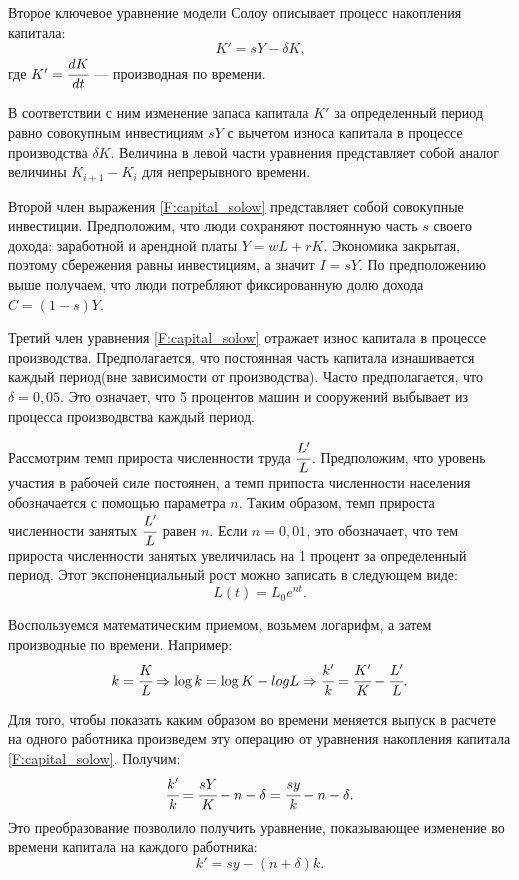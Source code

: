 Второе ключевое уравнение модели Солоу описывает процесс накопления капитала:
\begin{equation}
K' = sY-\delta K \text{,}
\label{F:capital_solow}
\end{equation}
где $K' = \cfrac{dK}{dt}$ --- производная по времени.

В соответствии с ним изменение запаса капитала $K'$ за определенный период равно совокупным инвестициям $sY$ с вычетом износа капитала в процессе производства $\delta K$.
Величина в левой части уравнения представляет собой аналог величины $K_{i+1} - K_{i}$ для непрерывного времени.

Второй член выражения \ref {F:capital_solow} представляет собой совокупные инвестиции.
Предположим, что люди сохраняют постоянную часть $s$ своего дохода: заработной и арендной платы $Y=wL+rK$.
Экономика закрытая, поэтому сбережения равны инвестициям, а значит $I=sY$.
По предположению выше получаем, что люди потребляют фиксированную долю дохода $C=(1-s)Y$.

Третий член уравнения \ref {F:capital_solow} отражает износ капитала в процессе производства.
Предполагается, что постоянная часть капитала изнашивается каждый период(вне зависимости от производства).
Часто предполагается, что $\delta = 0,05$.
Это означает, что 5 процентов машин и сооружений выбывает из процесса производвства каждый период.

Рассмотрим темп прироста численности труда $\cfrac{L'}{L}$.
Предположим, что уровень участия в рабочей силе постоянен, а темп припоста численности населения обозначается с помощью параметра $n$.
Таким образом, темп прироста численности занятых $\cfrac{L'}{L}$ равен $n$.
Если $n = 0,01$, это обозначает, что тем прироста численности занятых увеличилась на 1 процент за определенный период.
Этот экспоненциальный рост можно записать в следующем виде:
\begin{equation*}
	L(t) = L_{0}e^{nt}\text{.}
\end{equation*}

Воспользуемся математическим приемом, возьмем логарифм, а затем производные по времени.
Например:
\begin{equation*}
	k = \cfrac{K}{L}\Rightarrow \log{k}=\log{K} - log{L} \Rightarrow \cfrac{k'}{k} = \cfrac{K'}{K} - \cfrac{L'}{L}\text{.}
\end{equation*}

Для того, чтобы показать каким образом во времени меняется выпуск в расчете на одного работника произведем эту операцию от уравнения накопления капитала \ref{F:capital_solow}.
Получим:
\begin{equation*}
\cfrac{k'}{k} = \cfrac{sY}{K} - n - \delta = \cfrac{sy}{k} - n - \delta\text{.}
\end{equation*}
Это преобразование позволило получить уравнение, показывающее изменение во времени капитала на каждого работника:
\begin{equation*}
k'=sy-(n + \delta)k\text{.}
\end{equation*}

